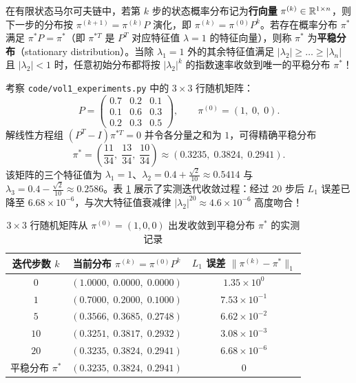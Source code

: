 在有限状态马尔可夫链中，若第 $k$ 步的状态概率分布记为\textbf{行向量} $\pi^{(k)} \in \mathbb{R}^{1\times n}$，则下一步的分布按 $\pi^{(k+1)} = \pi^{(k)} P$ 演化，即 $\pi^{(k)} = \pi^{(0)} P^k$。若存在概率分布 $\pi^*$ 满足 $\pi^* P = \pi^*$（即 $\pi^{*T}$ 是 $P^T$ 对应特征值 $\lambda = 1$ 的特征向量），则称 $\pi^*$ 为\textbf{平稳分布}（stationary distribution）。当除 $\lambda_1 = 1$ 外的其余特征值满足 $|\lambda_2| \ge \dots \ge |\lambda_n|$ 且 $|\lambda_2| < 1$ 时，任意初始分布都将按 $|\lambda_2|^k$ 的指数速率收敛到唯一的平稳分布 $\pi^*$！

\begin{example}
\label{ex:ch3-markov-exp}
考察 \texttt{code/vol1\_experiments.py} 中的 $3\times 3$ 行随机矩阵：
\[
  P = \begin{pmatrix} 0.7 & 0.2 & 0.1 \\ 0.1 & 0.6 & 0.3 \\ 0.2 & 0.3 & 0.5 \end{pmatrix},
  \qquad \pi^{(0)} = (1,\; 0,\; 0).
\]
解线性方程组 $(P^T - I)\pi^{*T} = 0$ 并令各分量之和为 $1$，可得精确平稳分布
\[
  \pi^* = \left(\frac{11}{34},\; \frac{13}{34},\; \frac{10}{34}\right) \approx (0.3235,\; 0.3824,\; 0.2941).
\]
该矩阵的三个特征值为 $\lambda_1 = 1$、$\lambda_2 = 0.4 + \frac{\sqrt{2}}{10} \approx 0.5414$ 与 $\lambda_3 = 0.4 - \frac{\sqrt{2}}{10} \approx 0.2586$。表 \ref{tab:ch3-markov} 展示了实测迭代收敛过程：经过 20 步后 $L_1$ 误差已降至 $6.68 \times 10^{-6}$，与次大特征值衰减律 $|\lambda_2|^{20} \approx 4.6 \times 10^{-6}$ 高度吻合！
\end{example}

\begin{table}[htbp]
  \centering
  \caption{$3\times 3$ 行随机矩阵从 $\pi^{(0)}=(1,0,0)$ 出发收敛到平稳分布 $\pi^*$ 的实测记录}
  \label{tab:ch3-markov}
  \small
  \begin{tabular}{@{}ccc@{}}
    \toprule
    \textbf{迭代步数 $k$} & \textbf{当前分布 $\pi^{(k)} = \pi^{(0)} P^k$} & \textbf{$L_1$ 误差 $\|\pi^{(k)} - \pi^*\|_1$} \\
    \midrule
    $0$  & $(1.0000,\; 0.0000,\; 0.0000)$ & $1.35\times 10^{0}$ \\
    $1$  & $(0.7000,\; 0.2000,\; 0.1000)$ & $7.53\times 10^{-1}$ \\
    $5$  & $(0.3566,\; 0.3685,\; 0.2748)$ & $6.62\times 10^{-2}$ \\
    $10$ & $(0.3251,\; 0.3817,\; 0.2932)$ & $3.08\times 10^{-3}$ \\
    $20$ & $(0.3235,\; 0.3824,\; 0.2941)$ & $6.68\times 10^{-6}$ \\
    \midrule
    平稳分布 $\pi^*$ & $(0.3235,\; 0.3824,\; 0.2941)$ & $0$ \\
    \bottomrule
  \end{tabular}
\end{table}

